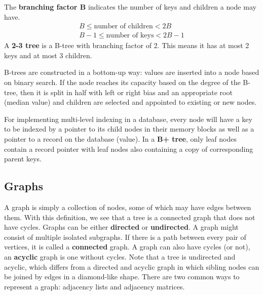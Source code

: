 \documentclass{article}
\begin{document}
    The \textbf{branching factor B} indicates the number of keys and children a node may have.
    \begin{align*}
        B \leq \text{number of children} < 2B \\
        B - 1 \leq \text{number of keys} < 2B - 1
    \end{align*}
    A \textbf{2-3 tree} is a B-tree with branching factor of 2. This means it has at most 2 keys and at most 3 children. 
    
    B-trees are constructed in a bottom-up way: values are inserted into a node based on binary search. If the node reaches its capacity based on the degree of the B-tree, then it is split in half with left or right bias and an appropriate root (median value) and children are selected and appointed to existing or new nodes.
    
    For implementing multi-level indexing in a database, every node will have a key to be indexed by a pointer to its child nodes in their memory blocks as well as a pointer to a record on the database (value). In a \textbf{B+ tree}, only leaf nodes contain a record pointer with leaf nodes also containing a copy of corresponding parent keys.
    

    \subsection{Graphs}
    A graph is simply a collection of nodes, some of which may have edges between them. With this definition, we see that a tree is a connected graph that does not have cycles. Graphs can be either \textbf{directed} or \textbf{undirected}. A graph might consist of multiple isolated subgraphs. If there is a path between every pair of vertices, it is called a \textbf{connected} graph. A graph can also have cycles (or not), an \textbf{acyclic} graph is one without cycles. Note that a tree is undirected and acyclic, which differs from a directed and acyclic graph in which sibling nodes can be joined by edges in a diamond-like shape. There are two common ways to represent a graph: adjacency lists and adjacency matrices. 
    
\end{document}
